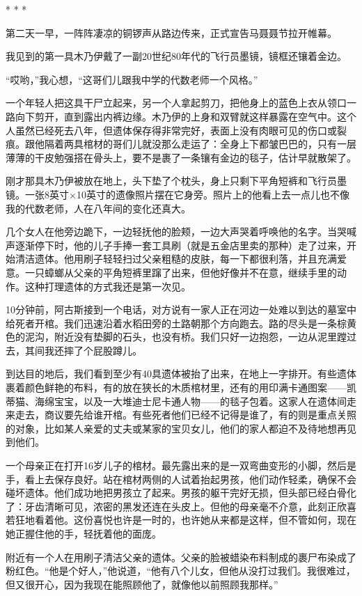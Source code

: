 \documentclass[12pt,oneside]{book}
\begin{document}
\begin{bookref}[frametitle={\cite{好好告别：世界葬礼观察手记}}]
\begin{center}
* * *
\end{center}

第二天一早，一阵阵凄凉的铜锣声从路边传来，正式宣告马聂聂节拉开帷幕。

我见到的第一具木乃伊戴了一副20世纪80年代的飞行员墨镜，镜框还镶着金边。

“哎哟，”我心想，“这哥们儿跟我中学的代数老师一个风格。”

一个年轻人把这具干尸立起来，另一个人拿起剪刀，把他身上的蓝色上衣从领口一路向下剪开，直到露出内裤边缘。木乃伊的上身和双臂就这样暴露在空气中。这个人虽然已经死去八年，但遗体保存得非常完好，表面上没有肉眼可见的伤口或裂痕。跟他隔着两具棺材的哥们儿就没那么走运了：全身上下都皱巴巴的，只有一层薄薄的干皮勉强搭在骨头上，要不是裹了一条镶有金边的毯子，估计早就散架了。

刚才那具木乃伊被放在地上，头下垫了个枕头，身上只剩下平角短裤和飞行员墨镜。一张8英寸×10英寸的遗像照片摆在它身旁。照片上的他看上去一点儿也不像我的代数老师，人在八年间的变化还真大。

几个女人在他旁边跪下，一边轻抚他的脸颊，一边大声哭着呼唤他的名字。当哭喊声逐渐停下时，他的儿子手捧一套工具刷（就是五金店里卖的那种）走了过来，开始清洁遗体。他用刷子轻轻扫过父亲粗糙的皮肤，每一下都很利落，并且充满爱意。一只蟑螂从父亲的平角短裤里蹿了出来，但他好像并不在意，继续手里的动作。这种打理遗体的方式我还是第一次见。

10分钟前，阿古斯接到一个电话，对方说有一家人正在河边一处难以到达的墓室中给死者开棺。我们迅速沿着水稻田旁的土路朝那个方向跑去。路的尽头是一条棕黄色的泥沟，附近没有垫脚的石头，也没有桥。我们只好一边抱怨，一边从泥里蹚过去，其间我还摔了个屁股蹲儿。

到达目的地后，我们看到至少有40具遗体被抬了出来，在地上一字排开。有些遗体裹着颜色鲜艳的布料，有的放在狭长的木质棺材里，还有的用印满卡通图案——凯蒂猫、海绵宝宝，以及一大堆迪士尼卡通人物——的毯子包着。这家人在遗体间走来走去，商议要先给谁开棺。有些死者他们已经不记得是谁了，有的则是重点关照的对象，比如某人亲爱的丈夫或某家的宝贝女儿，他们的家人都迫不及待地想再见到他们。

一个母亲正在打开16岁儿子的棺材。最先露出来的是一双弯曲变形的小脚，然后是手，看上去保存良好。站在棺材两侧的人试着抬起男孩，他们动作轻柔，确保不会碰坏遗体。他们成功地把男孩立了起来。男孩的躯干完好无损，但头部已经白骨化了：牙齿清晰可见，浓密的黑发还连在头皮上。但他的母亲毫不介意，此刻正欣喜若狂地看着他。这份喜悦也许是一时的，也许她从来都是这样，但不管如何，现在她正握住他的手，轻抚着他的面庞。

附近有一个人在用刷子清洁父亲的遗体。父亲的脸被蜡染布料制成的裹尸布染成了粉红色。“他是个好人，”他说道，“他有八个儿女，但他从没打过我们。我很难过，但又很开心，因为我现在能照顾他了，就像他以前照顾我那样。”


\end{bookref}
\end{document}
